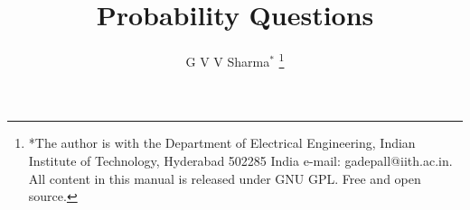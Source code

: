 \documentclass[journal,12pt,twocolumn]{IEEEtran}
\begin{document}
\let\StandardTheFigure\thefigure
\let\vec\mathbf
\renewcommand{\thefigure}{\theproblem}



\def\putbox#1#2#3{\makebox[0in][l]{\makebox[#1][l]{}\raisebox{\baselineskip}[0in][0in]{\raisebox{#2}[0in][0in]{#3}}}}
     \def\rightbox#1{\makebox[0in][r]{#1}}
     \def\centbox#1{\makebox[0in]{#1}}
     \def\topbox#1{\raisebox{-\baselineskip}[0in][0in]{#1}}
     \def\midbox#1{\raisebox{-0.5\baselineskip}[0in][0in]{#1}}

\vspace{3cm}

\title{
Probability Questions
}
\author{ G V V Sharma$^{*}$%
	\thanks{*The author is with the Department
		of Electrical Engineering, Indian Institute of Technology, Hyderabad
		502285 India e-mail:  gadepall@iith.ac.in. All content in this manual is released under GNU GPL.  Free and open source.}
	
}	


%
%
%

% 
%
\end{document}
